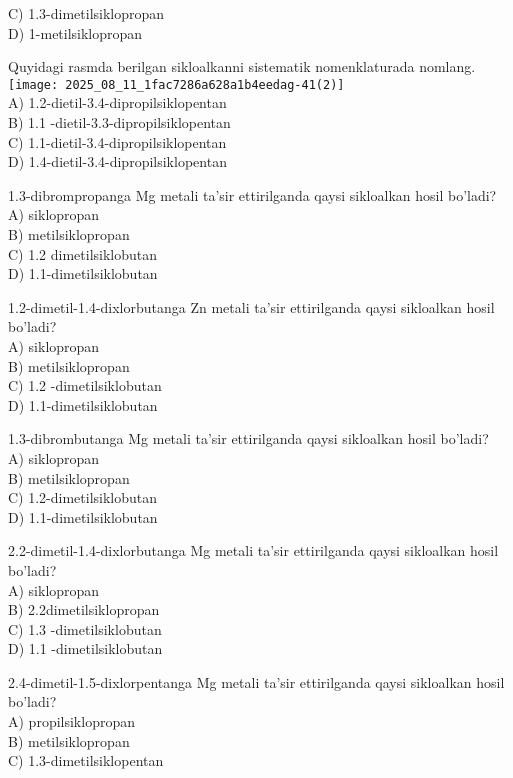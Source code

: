C) 1.3-dimetilsiklopropan\\
D) 1-metilsiklopropan
  \item Quyidagi rasmda berilgan sikloalkanni sistematik nomenklaturada nomlang.\\
\texttt{[image: 2025\_08\_11\_1fac7286a628a1b4eedag-41(2)]}\\
A) 1.2-dietil-3.4-dipropilsiklopentan\\
B) 1.1 -dietil-3.3-dipropilsiklopentan\\
C) 1.1-dietil-3.4-dipropilsiklopentan\\
D) 1.4-dietil-3.4-dipropilsiklopentan
  \item 1.3-dibrompropanga Mg metali ta'sir ettirilganda qaysi sikloalkan hosil bo'ladi?\\
A) siklopropan\\
B) metilsiklopropan\\
C) 1.2 dimetilsiklobutan\\
D) 1.1-dimetilsiklobutan\\
  \item 1.2-dimetil-1.4-dixlorbutanga Zn metali ta'sir ettirilganda qaysi sikloalkan hosil bo'ladi?\\
A) siklopropan\\
B) metilsiklopropan\\
C) 1.2 -dimetilsiklobutan\\
D) 1.1-dimetilsiklobutan
  \item 1.3-dibrombutanga Mg metali ta'sir ettirilganda qaysi sikloalkan hosil bo'ladi?\\
A) siklopropan\\
B) metilsiklopropan\\
C) 1.2-dimetilsiklobutan\\
D) 1.1-dimetilsiklobutan
  \item 2.2-dimetil-1.4-dixlorbutanga Mg metali ta'sir ettirilganda qaysi sikloalkan hosil bo'ladi?\\
A) siklopropan\\
B) 2.2dimetilsiklopropan\\
C) 1.3 -dimetilsiklobutan\\
D) 1.1 -dimetilsiklobutan
  \item 2.4-dimetil-1.5-dixlorpentanga Mg metali ta'sir ettirilganda qaysi sikloalkan hosil bo'ladi?\\
A) propilsiklopropan\\
B) metilsiklopropan\\
C) 1.3-dimetilsiklopentan\\

